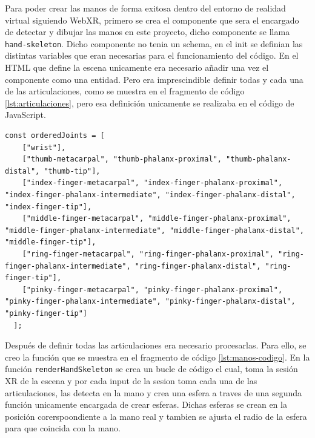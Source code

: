\documentclass[a4paper, 12pt]{book}
\begin{document}
Para poder crear las manos de forma exitosa dentro del entorno de realidad virtual siguiendo WebXR, primero se crea el componente que sera el encargado de detectar y dibujar las manos en este proyecto, dicho componente se llama \texttt{hand-skeleton}. Dicho componente no tenia un schema, en el init se definian las distintas variables que eran necesarias para el funcionamiento del código. 
En el HTML que define la escena unicamente era necesario añadir una vez el componente como una entidad. Pero era imprescindible definir todas y cada una de las articulaciones, como se muestra en el fragmento de código \ref{lst:articulaciones}, pero esa definición unicamente se realizaba en el código de JavaScript.
\begin{lstlisting}[caption=Definición de articulaciones, captionpos=b, label=lst:articulaciones]
  const orderedJoints = [
    ["wrist"],
    ["thumb-metacarpal", "thumb-phalanx-proximal", "thumb-phalanx-distal", "thumb-tip"],
    ["index-finger-metacarpal", "index-finger-phalanx-proximal", "index-finger-phalanx-intermediate", "index-finger-phalanx-distal", "index-finger-tip"],
    ["middle-finger-metacarpal", "middle-finger-phalanx-proximal", "middle-finger-phalanx-intermediate", "middle-finger-phalanx-distal", "middle-finger-tip"],
    ["ring-finger-metacarpal", "ring-finger-phalanx-proximal", "ring-finger-phalanx-intermediate", "ring-finger-phalanx-distal", "ring-finger-tip"],
    ["pinky-finger-metacarpal", "pinky-finger-phalanx-proximal", "pinky-finger-phalanx-intermediate", "pinky-finger-phalanx-distal", "pinky-finger-tip"]
  ];
\end{lstlisting}
Después de definir todas las articulaciones era necesario procesarlas. 
Para ello, se creo la función que se muestra en el fragmento de código \ref{lst:manos-codigo}. En la función \texttt{renderHandSkeleton} se crea un bucle de código el cual, toma la sesión XR de la escena y por cada input de la sesion toma cada una de las articulaciones, las detecta en la mano y crea una esfera a traves de una segunda función unicamente encargada de crear esferas. Dichas esferas se crean en la posición corerspoondiente a la mano real
y tambien se ajusta el radio de la esfera para que coincida con la mano. 
\end{document}
